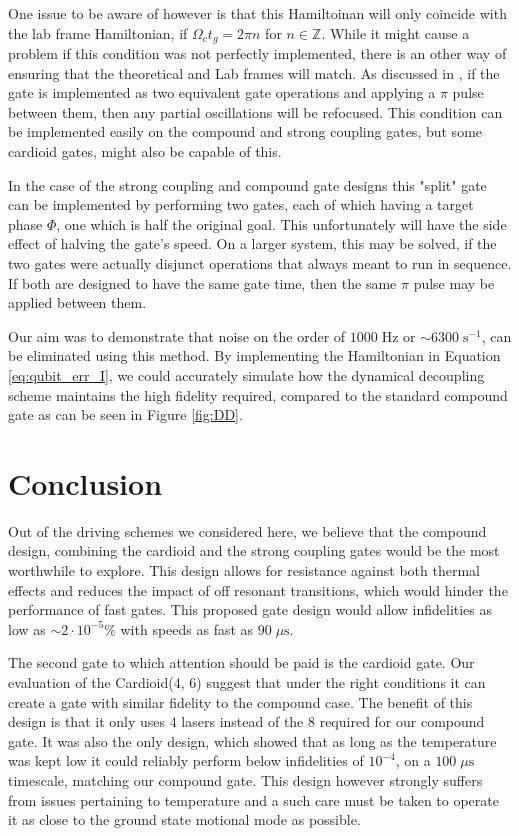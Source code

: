 \documentclass[12pt,twoside]{report}
\begin{document}
One issue to be aware of however is that this Hamiltoinan will only coincide with the lab frame Hamiltonian, if $\Omega_c t_g = 2\pi n$ for $n \in \mathbb{Z}$. While it might cause a problem if this condition was not perfectly implemented, there is an other way of ensuring that the theoretical and Lab frames will match.  As discussed in \cite{DD_Paper}, if the gate is implemented as two equivalent gate operations and applying a $\pi$ pulse between them, then any partial oscillations will be refocused. This condition can be implemented easily on the compound and strong coupling gates, but some cardioid gates, might also be capable of this.

In the case of the strong coupling and compound gate designs this "split" gate can be implemented by performing two gates, each of which having a target phase $\Phi$, one which is half the original goal. This unfortunately will have the side effect of halving the gate's speed. On a larger system, this may be solved, if the two gates were actually disjunct operations that always meant to run in sequence. If both are designed to have the same gate time, then the same $\pi$ pulse may be applied between them.

Our aim was to demonstrate that noise on the order of $1000\;\text{Hz}$ or $\sim 6300\;\text{s}^{-1}$, can be eliminated using this method. By implementing the Hamiltonian in Equation \eqref{eq:qubit_err_I}, we could accurately simulate how the dynamical decoupling scheme maintains the high fidelity required, compared to the standard compound gate as can be seen in Figure \ref{fig:DD}.

\chapter{Conclusion}
\label{Conclusion}

Out of the driving schemes we considered here, we believe that the compound design, combining the cardioid and the strong coupling gates would be the most worthwhile to explore. This design allows for resistance against both thermal effects and reduces the impact of off resonant transitions, which would hinder the performance of fast gates. This proposed gate design would allow infidelities as low as $\sim 2\cdot10^{-5}\%$ with speeds as fast as $90\;\mu\text{s}$.

The second gate to which attention should be paid is the cardioid gate. Our evaluation of the Cardioid($4$, $6$) suggest that under the right conditions it can create a gate with similar fidelity to the compound case. The benefit of this design is that it only uses $4$ lasers instead of the $8$ required for our compound gate. It was also the only design, which showed that as long as the temperature was kept low it could reliably perform below infidelities of $10^{-4}$, on a $100\;\mu\text{s}$ timescale, matching our compound gate. This design however strongly suffers from issues pertaining to temperature and a such care must be taken to operate it as close to the ground state motional mode as possible.
\end{document}
